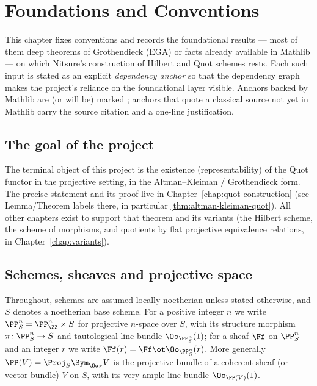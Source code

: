 
\chapter{Foundations and Conventions}
\label{chap:basic}

This chapter fixes conventions and records the foundational results — most of
them deep theorems of Grothendieck (EGA) or facts already available in Mathlib —
on which Nitsure's construction of Hilbert and Quot schemes rests. Each such
input is stated as an explicit \emph{dependency anchor} so that the dependency
graph makes the project's reliance on the foundational layer visible. Anchors
backed by Mathlib are (or will be) marked \mathlibok; anchors that quote a
classical source not yet in Mathlib carry the source citation and a one-line
justification.

\section{The goal of the project}

The terminal object of this project is the existence (representability) of the
Quot functor in the projective setting, in the Altman--Kleiman / Grothendieck
form. The precise statement and its proof live in
Chapter~\ref{chap:quot-construction}
(see Lemma/Theorem labels there, in particular \cref{thm:altman-kleiman-quot}).
All other chapters exist to support that theorem and its variants
(the Hilbert scheme, the scheme of morphisms, and quotients by flat projective
equivalence relations, in Chapter~\ref{chap:variants}).

\section{Schemes, sheaves and projective space}

Throughout, schemes are assumed locally noetherian unless stated otherwise, and
$S$ denotes a noetherian base scheme. For a positive integer $n$ we write
$\PP^n_S = \PP^n_{\ZZ}\times S$ for projective $n$-space over $S$, with its
structure morphism $\pi\colon \PP^n_S\to S$ and tautological line bundle
$\Oo_{\PP^n_S}(1)$; for a sheaf $\Ff$ on $\PP^n_S$ and an integer $r$ we write
$\Ff(r) = \Ff\ot \Oo_{\PP^n_S}(r)$. More generally $\PP(V) = \Proj_S \Sym_{\Oo_S} V$
is the projective bundle of a coherent sheaf (or vector bundle) $V$ on $S$, with
its very ample line bundle $\Oo_{\PP(V)}(1)$.

